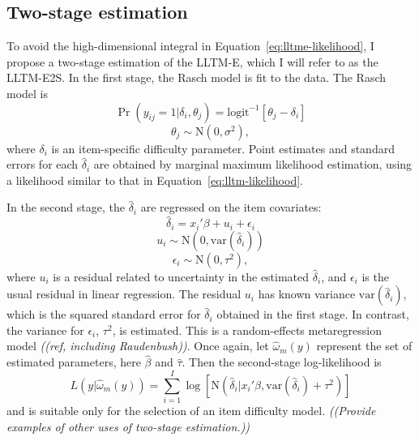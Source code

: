\subsection{Two-stage estimation}

To avoid the high-dimensional integral in Equation~\ref{eq:lltme-likelihood}, I propose a two-stage estimation of the LLTM-E, which I will refer to as the LLTM-E2S.
In the first stage, the Rasch model is fit to the data. The Rasch model is
\begin{equation}
	\Pr(y_{ij} = 1 | \delta_i, \theta_j) =
	\mathrm{logit}^{-1} \left [ \theta_j - \delta_i \right ]
\end{equation}
\begin{equation}
	\theta_j \sim \mathrm{N}(0, \sigma^2)
,\end{equation} 
where $\delta_i$ is an item-specific difficulty parameter.  Point estimates and standard errors for each $\hat \delta_i$ are obtained by marginal maximum likelihood estimation, using a likelihood similar to that in Equation~\ref{eq:lltm-likelihood}.

In the second stage, the $\hat \delta_i$ are regressed on the item covariates:
\begin{equation}
	\hat \delta_i = x_i'\beta + u_i + \epsilon_i
\end{equation}
\begin{equation}
	u_i \sim \mathrm{N}(0, \mathrm{var}(\hat \delta_i))
\end{equation}
\begin{equation}
	\epsilon_i \sim \mathrm{N}(0, \tau^2)
,\end{equation}
where $u_i$ is a residual related to uncertainty in the estimated $\hat \delta_i$, and $\epsilon_i$ is the usual residual in linear regression. 
The residual $u_i$ has known variance $\mathrm{var}(\hat \delta_i)$, which is the squared standard error for $\hat \delta_i$ obtained in the first stage. 
In contrast, the variance for $\epsilon_i$, $\tau^2$, is estimated.
This is a random-effects metaregression model \emph{((ref, including Raudenbush))}.
Once again, let $\hat \omega_m(y)$ represent the set of estimated parameters, here $\hat \beta$ and $\hat \tau$. 
Then the second-stage log-likelihood is
\begin{equation}
	L(y | \hat \omega_m(y)) = \sum_{i=1}^I \log 
	[ \mathrm{N}(\hat \delta_i | x_i'\beta, \mathrm{var}(\hat \delta_i) + \tau^2) ]
\end{equation}
and is suitable only for the selection of an item difficulty model.
\emph{((Provide examples of other uses of two-stage estimation.))}


